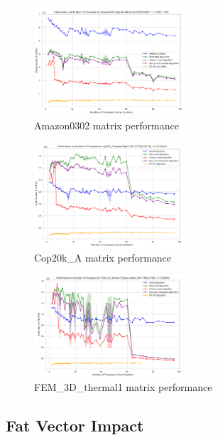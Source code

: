 \documentclass[12pt,oneside]{book} %
\begin{document}
\begin{figure}[H]
    \centering
    \includegraphics[width=0.5\textwidth]{../results/matrix_dim/amazon0302_k6_performance.png}
    \caption{Amazon0302 matrix performance}\label{fig:amazon0302-k6-performance}
\end{figure}

\begin{figure}[H]
    \centering
    \includegraphics[width=0.5\textwidth]{../results/matrix_dim/cop20k_A_k6_performance.png}
    \caption{Cop20k\_A matrix performance}\label{fig:cop20k-a-k6-performance-1}
\end{figure}

\begin{figure}[H]
    \centering
    \includegraphics[width=0.5\textwidth]{../results/matrix_dim/FEM_3D_thermal1_k6_performance.png}
    \caption{FEM\_3D\_thermal1 matrix performance}\label{fig:fem-3d-thermal1-k6-performance}
\end{figure}

\subsection{Fat Vector Impact}
\end{document}
